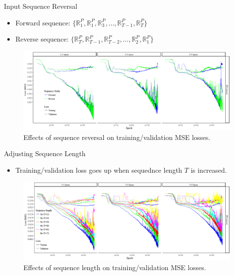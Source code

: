 \documentclass{beamer}
\begin{document}
\begin{frame}{Input Sequence Reversal}
  \begin{itemize}
    \item Forward sequence: \(\{\mathbb{R}_1^P, \mathbb{R}_1^P, \mathbb{R}_3^P,...,\mathbb{R}_{T-1}^P, \mathbb{R}_T^P \}\)
    \item Reverse sequence: \(\{\mathbb{R}_T^P, \mathbb{R}_{T-1}^P, \mathbb{R}_{T-2}^P,...,\mathbb{R}_2^P, \mathbb{R}_1^P \}\)
  \end{itemize}
  \begin{figure}[H]
  	\centering
  	\includegraphics[width=1\textwidth]{reverse.PNG}
  	\caption{Effects of sequence reversal on training/validation MSE losses.}
  \end{figure}
\end{frame}



\begin{frame}{Adjusting Sequence Length}
  \begin{itemize}
    \item Training/validation loss goes up when sequednce length \(T\) is increased.
  \end{itemize}
  \begin{figure}[H]
  	\centering
  	\includegraphics[width=1\textwidth]{sequence_length.PNG}
  	\caption{Effects of sequence length on training/validation MSE losses.}
  \end{figure}
\end{frame}
\end{document}
